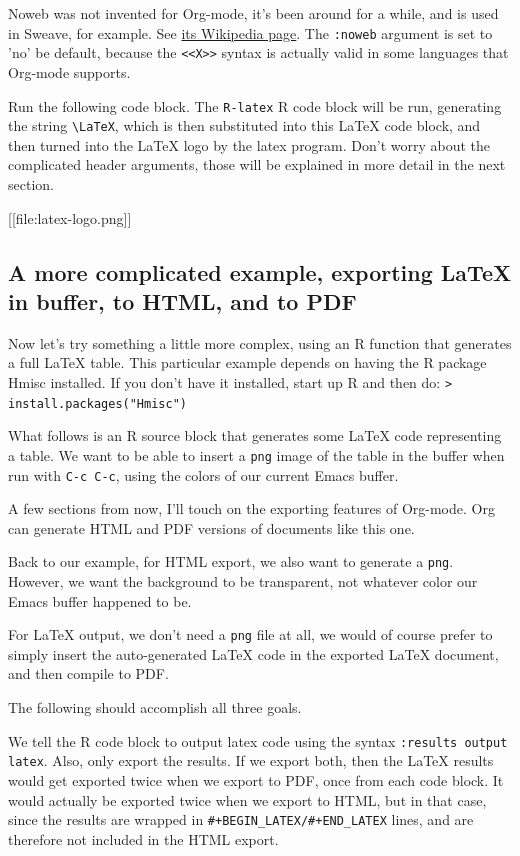 \documentclass[11pt]{article}
\begin{document}
Noweb was not invented for Org-mode, it's been around for a while, and is used in Sweave, for example. See \href{http://en.wikipedia.org/wiki/Noweb}{its Wikipedia page}. The \texttt{:noweb} argument is set to 'no' be default, because the \texttt{<<X>>} syntax is actually valid in some languages that Org-mode supports.

Run the following code block. The \texttt{R-latex} R code block will be run, generating the string \texttt{\textbackslash{}LaTeX}, which is then substituted into this \LaTeX{} code block, and then turned into the \LaTeX{} logo by the latex program. Don't worry about the complicated header arguments, those will be explained in more detail in the next section. 

[[file:latex-logo.png]]
\subsection*{A more complicated example, exporting \LaTeX{} in buffer, to HTML, and to PDF}
\label{sec-6-2}

Now let's try something a little more complex, using an R function that generates a full \LaTeX{} table. This particular example depends on having the R package Hmisc installed. If you don't have it installed, start up R and then do: \texttt{> install.packages("Hmisc")}

What follows is an R source block that generates some \LaTeX{} code representing a table.  We want to be able to insert a \texttt{png} image of the table in the buffer when run with \texttt{C-c C-c}, using the colors of our current Emacs buffer.

A few sections from now, I'll touch on the exporting features of Org-mode.  Org can generate HTML and PDF versions of documents like this one.

Back to our example, for HTML export, we also want to generate a \texttt{png}. However, we want the background to be transparent, not whatever color our Emacs buffer happened to be.

For \LaTeX{} output, we don't need a \texttt{png} file at all, we would of course prefer to simply insert the auto-generated \LaTeX{} code in the exported \LaTeX{} document, and then compile to PDF. 

The following should accomplish all three goals.  

We tell the R code block to output latex code using the syntax \texttt{:results output latex}.  Also, only export the results.  If we export both, then the \LaTeX{} results would get exported twice when we export to PDF, once from each code block.  It would actually be exported twice when we export to HTML, but in that case, since the results are wrapped in \texttt{\#+BEGIN\_LATEX/\#+END\_LATEX} lines, and are therefore not included in the HTML export.
\end{document}
